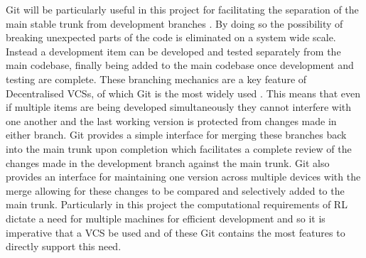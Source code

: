 \documentclass[hidelinks,journal]{IEEEtran}
\begin{document}
Git will be particularly useful in this project for facilitating the separation of the main stable trunk from development branches \parencite{De-Alwis09}. By doing so the possibility of breaking unexpected parts of the code is eliminated on a system wide scale. Instead a development item can be developed and tested separately from the main codebase, finally being added to the main codebase once development and testing are complete. These branching mechanics are a key feature of Decentralised VCSs, of which Git is the most widely used \parencite{De-Alwis09}. This means that even if multiple items are being developed simultaneously they cannot interfere with one another and the last working version is protected from changes made in either branch. Git provides a simple interface for merging these branches back into the main trunk upon completion which facilitates a complete review of the changes made in the development branch against the main trunk. Git also provides an interface for maintaining one version across multiple devices with the merge allowing for these changes to be compared and selectively added to the main trunk. Particularly in this project the computational requirements of RL dictate a need for multiple machines for efficient development and so it is imperative that a VCS be used and of these Git contains the most features to directly support this need.
\end{document}
